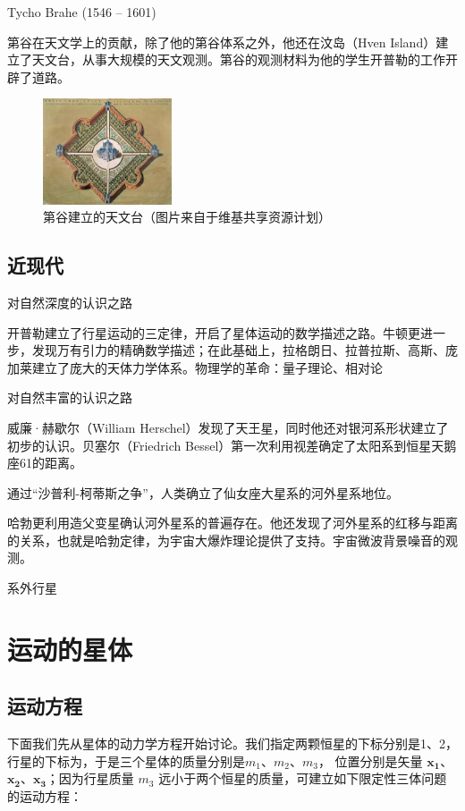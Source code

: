 \documentclass[a4paper,10.5pt]{article}
\begin{document}
Tycho Brahe (1546 – 1601)

第谷在天文学上的贡献，除了他的第谷体系之外，他还在汶岛（Hven Island）建立了天文台，从事大规模的天文观测。第谷的观测材料为他的学生开普勒的工作开辟了道路。

\begin{figure}[ht]
\centering
\includegraphics[width=1.5in]{images/1_09-Uraniborgskiss.jpg}
\caption{第谷建立的天文台（图片来自于维基共享资源计划）}
\end{figure}

\newpage

\subsection{近现代}

对自然深度的认识之路

开普勒建立了行星运动的三定律，开启了星体运动的数学描述之路。牛顿更进一步，发现万有引力的精确数学描述；在此基础上，拉格朗日、拉普拉斯、高斯、庞加莱建立了庞大的天体力学体系。物理学的革命：量子理论、相对论

对自然丰富的认识之路

威廉·赫歇尔（William Herschel）发现了天王星，同时他还对银河系形状建立了初步的认识。贝塞尔（Friedrich Bessel）第一次利用视差确定了太阳系到恒星天鹅座61的距离。

通过“沙普利-柯蒂斯之争”，人类确立了仙女座大星系的河外星系地位。

哈勃更利用造父变星确认河外星系的普遍存在。他还发现了河外星系的红移与距离的关系，也就是哈勃定律，为宇宙大爆炸理论提供了支持。宇宙微波背景噪音的观测。

系外行星

\newpage

\section{运动的星体}

\subsection{运动方程}

下面我们先从星体的动力学方程开始讨论。我们指定两颗恒星的下标分别是1、2，行星的下标为，于是三个星体的质量分别是$m_1$、$m_2$、$m_3$，
位置分别是矢量 $\mathbf{x_1}$、$\mathbf{x_2}$、$\mathbf{x_3}$；因为行星质量 $m_3$ 远小于两个恒星的质量，可建立如下限定性三体问题的运动方程：
\end{document}
